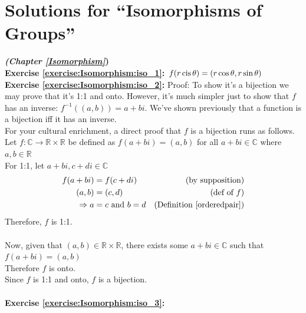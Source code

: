 
\section{Solutions for ``Isomorphisms of Groups''}
\noindent\textbf{\textit{ (Chapter \ref{Isomorphism}})}\bigskip
\\
\textbf{Exercise \ref{exercise:Isomorphism:iso_1}:} 
$f(r \operatorname{cis} \theta) = (r\cos \theta, r \sin \theta )$
\\
\textbf{Exercise \ref{exercise:Isomorphism:iso_2}:}
Proof: To show it's a  bijection we may prove that it's 1:1 and onto.  However, it's much simpler just to show that 
$f$ has an inverse:  $f^{-1}( (a,b) ) = a + bi$.  We've shown previously that a function is a bijection iff it has an inverse.
\\
For your cultural enrichment, a direct proof that $f$ is a bijection runs as follows.
Let $f : {\mathbb C} \longrightarrow {\mathbb R} \times {\mathbb R}$ be defined as $f(a + bi) = (a,b)$ for all $a +  bi \in {\mathbb C}$ where $a, b \in {\mathbb R}$
\\
For 1:1, let $a + bi, c + di \in {\mathbb C}$
\begin{align*}
f(a + bi) &= f(c + di) &\text{(by supposition)}
\\
(a, b) &= (c, d) &\text{(def of\ } f)
\\
\implies a &= c \text{\ and\ } b = d &(\text{Definition~\ref{orderedpair}})
\end{align*}
Therefore, $f$ is 1:1.
\\
\\
Now, given that $(a, b) \in {\mathbb R} \times {\mathbb R}$, there exists some $a + bi \in {\mathbb C}$ such that $f(a + bi) = (a, b)$
\\
Therefore $f$ is onto.
\\
Since $f$ is 1:1 and onto, $f$ is a bijection.
\\\\

\noindent\textbf{Exercise \ref{exercise:Isomorphism:iso_3}:}
\\
\begin{figure}[H]
\end{figure}

